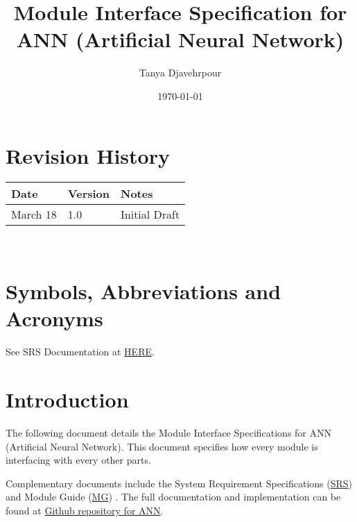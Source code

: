 \documentclass[12pt, titlepage]{article}
\begin{document}
\title{Module Interface Specification for ANN (Artificial Neural Network)}

\author{Tanya Djavehrpour}

\date{\today}

\maketitle


\section{Revision History}

\begin{tabularx}{\textwidth}{p{3cm}p{2cm}X}
\toprule {\bf Date} & {\bf Version} & {\bf Notes}\\
\midrule
March 18 & 1.0 & Initial Draft\\
\bottomrule
\end{tabularx}

~\newpage

\section{Symbols, Abbreviations and Acronyms}

See SRS Documentation \cite{SRS} at \href{https://github.com/tanya-jp/ANN-CAS741/blob/main/docs/SRS/SRS.pdf}{HERE}.

\newpage

\tableofcontents

\newpage


\section{Introduction}

The following document details the Module Interface Specifications for
ANN (Artificial Neural Network). This document specifies how every module 
is interfacing with every other parts.

Complementary documents include the System Requirement Specifications 
(\href{https://github.com/tanya-jp/ANN-CAS741/blob/main/docs/SRS/SRS.pdf}{SRS}) \cite{SRS}
and Module Guide (\href{https://github.com/tanya-jp/ANN-CAS741/blob/main/docs/Design/SoftArchitecture/MG.pdf}{MG}) \cite{MG}.  
The full documentation and implementation can be
found at \href{https://github.com/tanya-jp/ANN-CAS741/tree/main}{Github repository for ANN}.
\end{document}
